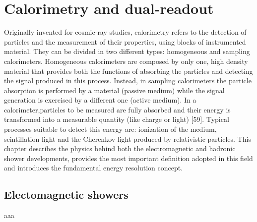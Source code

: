 \chapter{Calorimetry and dual-readout}
Originally invented for cosmic-ray studies, calorimetry refers to the detection of particles and the measurement of their properties, using blocks of instrumented material.
They can be divided in two different types: homogeneous and sampling calorimeters.
Homogeneous calorimeters are composed by only one, high density material that provides both the functions of absorbing the particles and detecting the signal produced in this process.
Instead, in sampling calorimeters the particle absorption is performed by a material (passive medium) while the signal generation is exercised by a different one (active medium).
In a calorimeter,particles to be measured are fully absorbed and their energy is transformed into a measurable quantity (like charge or light) [59].
Typical processes suitable to detect this energy are: ionization of the medium, scintillation light and the Cherenkov light produced by relativistic particles.
This chapter describes the physics behind both the electromagnetic and hadronic shower developments, provides the most important definition adopted in this field and introduces the fundamental energy resolution concept.\\

\section{Electomagnetic showers}
aaa

